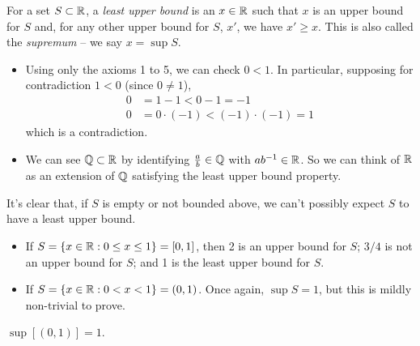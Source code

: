 \documentclass{../template/note}
\begin{document}
    \begin{definition}
        For a set \(S \subset \mathbb R\), a \emph{least upper bound} is an \(x \in \mathbb R\) such that \(x\) is an upper bound for \(S\) and, for any other upper bound for \(S\), \(x'\), we have \(x' \geq x\). This is also called the \emph{supremum} -- we say \(x = \sup S\).
    \end{definition}
    
    \begin{remark*}
        \begin{itemize}
            \item Using only the axioms 1 to 5, we can check \(0 < 1\). In particular, supposing for contradiction \(1 < 0\) (since \(0 \neq 1\)),
            \begin{align*}
                0 &= 1 - 1 < 0 - 1 = -1 \\
                0 &= 0 \cdot (-1) < (-1) \cdot (-1) = 1
            \end{align*}
            which is a contradiction.
            \item We can see \(\mathbb Q \subset \mathbb R\) by identifying \(\frac{a}{b} \in \mathbb Q\) with \(ab^{-1} \in \mathbb R\). So we can think of \(\mathbb R\) as an extension of \(\mathbb Q\) satisfying the least upper bound property.
        \end{itemize}
    \end{remark*}
    
    \begin{remark*}
        It's clear that, if \(S\) is empty or not bounded above, we can't possibly expect \(S\) to have a least upper bound.
    \end{remark*}
    


    \begin{example}
        \begin{itemize}
            \item If \(S = \{x \in \mathbb R: 0 \leq x \leq 1\} = [0, 1]\), then 2 is an upper bound for \(S\); \(3/4\) is not an upper bound for \(S\); and 1 is the least upper bound for \(S\).
            \item If \(S = \{x \in \mathbb R: 0 < x < 1\} = (0, 1)\). Once again, \(\sup S = 1\), but this is mildly non-trivial to prove.
        \end{itemize}
    \end{example}
    
    \begin{proposition}
        \(\sup[(0, 1)] = 1\).
    \end{proposition}
    
\end{document}
